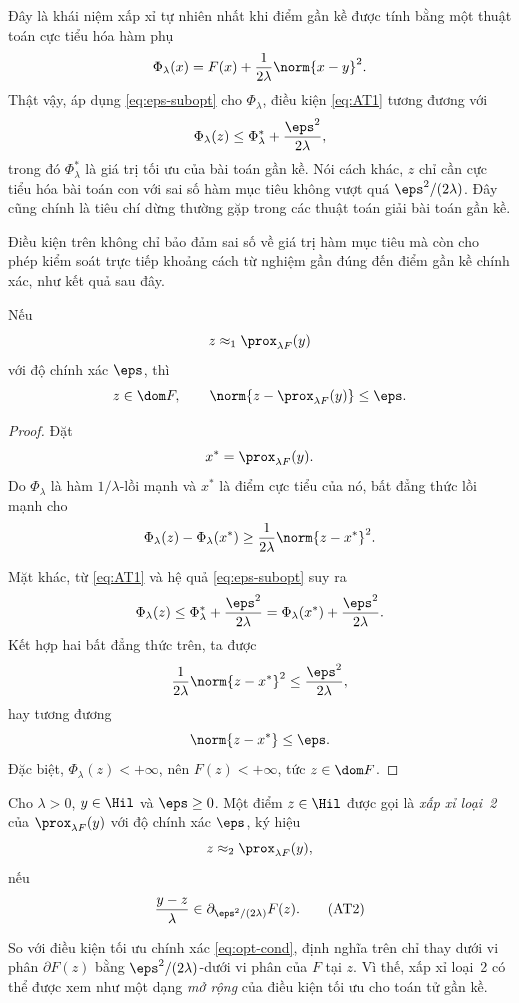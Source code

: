 Đây là khái niệm xấp xỉ tự nhiên nhất khi điểm gần kề được tính bằng một
thuật toán cực tiểu hóa hàm phụ
\[
\Phi_\lambda(x)
=
F(x)+\frac1{2\lambda}\norm{x-y}^2.
\]
Thật vậy, áp dụng \eqref{eq:eps-subopt} cho $\Phi_\lambda$, điều kiện
\eqref{eq:AT1} tương đương với
\[
\Phi_\lambda(z)
\le
\Phi_\lambda^*
+
\frac{\eps^2}{2\lambda},
\]
trong đó $\Phi_\lambda^*$ là giá trị tối ưu của bài toán gần kề. Nói cách
khác, $z$ chỉ cần cực tiểu hóa bài toán con với sai số hàm mục tiêu không
vượt quá $\eps^2/(2\lambda)$. Đây cũng chính là tiêu chí dừng thường gặp
trong các thuật toán giải bài toán gần kề.

Điều kiện trên không chỉ bảo đảm sai số về giá trị hàm mục tiêu mà còn cho
phép kiểm soát trực tiếp khoảng cách từ nghiệm gần đúng đến điểm gần kề
chính xác, như kết quả sau đây.

\begin{proposition}
\label{prop:type1-bound}
Nếu
\[
z\approx_1\prox_{\lambda F}(y)
\]
với độ chính xác $\eps$, thì
\[
z\in\dom F,
\qquad
\norm{z-\prox_{\lambda F}(y)}
\le
\eps.
\]
\end{proposition}

\begin{proof}
Đặt
\[
x^*=\prox_{\lambda F}(y).
\]
Do $\Phi_\lambda$ là hàm $1/\lambda$-lồi mạnh và $x^*$ là điểm cực tiểu của
nó, bất đẳng thức lồi mạnh cho
\[
\Phi_\lambda(z)-\Phi_\lambda(x^*)
\ge
\frac1{2\lambda}\norm{z-x^*}^2.
\]

Mặt khác, từ \eqref{eq:AT1} và hệ quả
\eqref{eq:eps-subopt} suy ra
\[
\Phi_\lambda(z)
\le
\Phi_\lambda^*
+
\frac{\eps^2}{2\lambda}
=
\Phi_\lambda(x^*)
+
\frac{\eps^2}{2\lambda}.
\]
Kết hợp hai bất đẳng thức trên, ta được
\[
\frac1{2\lambda}\norm{z-x^*}^2
\le
\frac{\eps^2}{2\lambda},
\]
hay tương đương
\[
\norm{z-x^*}\le\eps.
\]
Đặc biệt,
$\Phi_\lambda(z)<+\infty$, nên $F(z)<+\infty$, tức
$z\in\dom F$.
\end{proof}

\begin{definition}
Cho $\lambda>0$, $y\in\Hil$ và $\eps\ge0$. Một điểm
$z\in\Hil$ được gọi là \emph{xấp xỉ loại~2} của
$\prox_{\lambda F}(y)$ với độ chính xác $\eps$, ký hiệu
\[
z\approx_2\prox_{\lambda F}(y),
\]
nếu
\begin{equation}
\frac{y-z}{\lambda}
\in
\partial_{\eps^2/(2\lambda)}F(z).
\tag{AT2}
\label{eq:AT2}
\end{equation}
\end{definition}

So với điều kiện tối ưu chính xác
\eqref{eq:opt-cond}, định nghĩa trên chỉ thay dưới vi phân
$\partial F(z)$ bằng $\eps^2/(2\lambda)$-dưới vi phân của $F$ tại $z$. Vì thế, xấp xỉ loại~2 có thể được xem như một dạng \emph{mở rộng} của điều kiện tối ưu cho toán tử gần kề.

